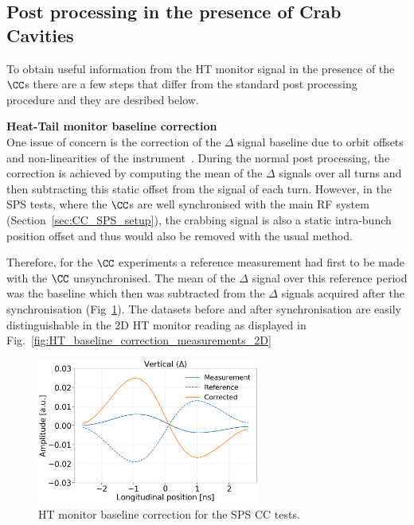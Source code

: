 \subsection{Post processing in the presence of Crab Cavities}\label{subsec:HT_post_process_CC}
To obtain useful information from the HT monitor signal in the presence of the $\CC$s there are a few steps that differ from the standard post processing procedure and they are desribed below.

\normalsize{\textbf{Heat-Tail monitor baseline correction}}\\
One issue of concern is the correction of the $\Delta$ signal  baseline due to orbit offsets and non-linearities of the instrument~\cite{Levens:2313358}. During the normal post processing, the correction is achieved by computing the mean of the $\Delta$ signals over all turns and then subtracting this static offset from the signal of each turn. However, in the SPS tests, where the $\CC$s are well synchronised with the main RF system (Section~\ref{sec:CC_SPS_setup}), the crabbing signal is also a static intra-bunch position offset and thus would also be removed with the usual method.

Therefore, for the $\CC$ experiments a reference measurement had first to be made with the $\CC$ unsynchronised. The mean of the $\Delta$ signal over this reference period was the baseline which then was subtracted from the $\Delta$ signals acquired after the synchronisation (Fig~\ref{fig:HT_baseline_correction}). The datasets before and after synchronisation are easily distinguishable in the 2D HT monitor reading as displayed in Fig.~\ref{fig:HT_baseline_correction_measurements_2D}


\begin{figure}[!h]
   \centering         
   \includegraphics[width=0.65\textwidth]{images/Ch4/HT_measures_vs_reference_vs_corrected__20180530_135105_baseline_correction_new_version.png}
       \caption{HT monitor baseline correction for the SPS CC tests.}
       \label{fig:HT_baseline_correction}
\end{figure}

